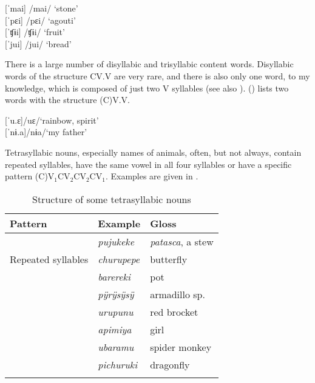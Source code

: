 \ea\label{ex:CVV}
    [ˈmai]	\tab /mai/	\tab\tab ‘stone’\\
    {[}ˈpɛi]	\tab\tab /pɛi/	\tab\tab ‘agouti’  \\
    {[}ˈʧɨi]	\tab\tab /ʧɨi/	\tab\tab ‘fruit’  \\
    {[}ˈjui]	\tab\tab /jui/	\tab\tab ‘bread’  \\%
    \xe
 

There is a large number of disyllabic and trisyllabic content words. Disyllabic words of the structure CV.V are very rare, and there is also only one word, to my knowledge, which is composed of just two V syllables (see also ). () lists two words with the structure (C)V.V.
     
      
 \ea\label{ex:CV-V} %
    {[}ˈu.ɛ]\tab\tab /uɛ/\tab\tab ‘rainbow, spirit’\\
    {[}ˈnɨ.a]\tab\tab /nɨa/\tab\tab ‘my father’\\
    \xe
    

Tetrasyllabic nouns, especially names of animals, often, but not always, contain repeated syllables, have the same vowel in all four syllables or have a specific pattern (C)V$_{1}$CV$_{2}$CV$_{2}$CV$_{1}$. Examples are given in .



\begin{table}
\caption{Structure of some tetrasyllabic nouns}

\begin{tabular}{lll}
\lsptoprule 
Pattern & Example & Gloss\\
\midrule
\multirow[t]{3}{*}{Repeated syllables} & \textit{pujukeke} & \textit{patasca}, a stew\\
& \textit{churupepe} & butterfly\\
& \textit{barereki} & pot\\
\tablevspace
\multirow[t]{2}{*}{Same V in all syllables} & \textit{pÿrÿsÿsÿ} & armadillo sp.\\
& \textit{urupunu} & red brocket\\
\tablevspace
\multirow[t]{3}{*}{(C)V$_{1}$CV$_{2}$CV$_{2}$CV$_{1}$} & \textit{apimiya} & girl\\
& \textit{ubaramu} & spider monkey\\
& \textit{pichuruki} & dragonfly\\
\lspbottomrule
\end{tabular}

\label{table:TetrasyllabicStructures}
\end{table}
%

